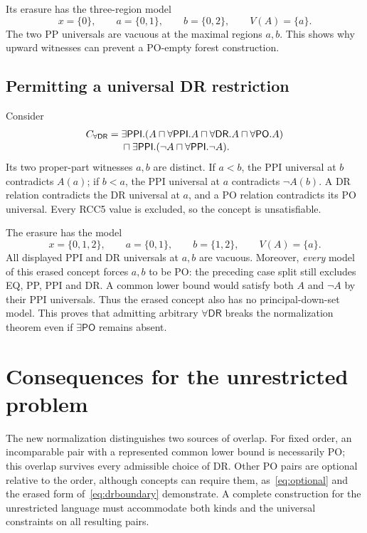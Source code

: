 \documentclass[11pt,letterpaper]{article}
\newcommand{\PPI}{\mathsf{PPI}}
\newcommand{\PO}{\mathsf{PO}}
\newcommand{\DR}{\mathsf{DR}}
\theoremstyle{definition}
\theoremstyle{remark}
\begin{document}
Its erasure has the three-region model
\[
x=\{0\},\qquad a=\{0,1\},\qquad b=\{0,2\},\qquad V(A)=\{a\}.
\]
The two PP universals are vacuous at the maximal regions $a,b$. This
shows why upward witnesses can prevent a PO-empty forest construction.

\subsection{Permitting a universal DR restriction}

Consider
\begin{align}
C_{\forall\DR}={}&
\exists\PPI.(A\sqcap\forall\PPI.A\sqcap\forall\DR.A
                         \sqcap\forall\PO.A)
\notag\\[-2pt]
&\sqcap\exists\PPI.(\neg A\sqcap\forall\PPI.\neg A).
\label{eq:drboundary}
\end{align}
Its two proper-part witnesses $a,b$ are distinct. If $a<b$, the PPI
universal at $b$ contradicts $A(a)$; if $b<a$, the PPI universal at
$a$ contradicts $\neg A(b)$. A DR relation contradicts the DR
universal at $a$, and a PO relation contradicts its PO universal.
Every RCC5 value is excluded, so the concept is unsatisfiable.

The erasure has the model
\[
x=\{0,1,2\},\qquad a=\{0,1\},\qquad b=\{1,2\},\qquad V(A)=\{a\}.
\]
All displayed PPI and DR universals at $a,b$ are vacuous. Moreover,
\emph{every} model of this erased concept forces $a,b$ to be PO:
the preceding case split still excludes EQ, PP, PPI and DR. A common
lower bound would satisfy both $A$ and $\neg A$ by their PPI universals.
Thus the erased concept also has no principal-down-set model. This proves
that admitting arbitrary $\forall\DR$ breaks the normalization theorem
even if $\exists\PO$ remains absent.

\section{Consequences for the unrestricted problem}
\label{sec:full}

The new normalization distinguishes two sources of overlap. For fixed
order, an incomparable pair with a represented common lower bound is
necessarily PO; this overlap survives every admissible choice of DR.
Other PO pairs are optional relative to the order, although concepts
can require them, as~\eqref{eq:optional} and the erased form
of~\eqref{eq:drboundary} demonstrate. A complete construction for the
unrestricted language must accommodate both kinds and the universal
constraints on all resulting pairs.
\end{document}

